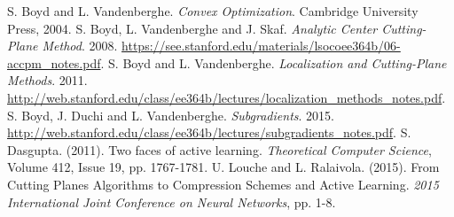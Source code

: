 \documentclass[11pt]{amsart}
\theoremstyle{definition}
\theoremstyle{remark}
\begin{document}
\begin{thebibliography}{99}
     S. Boyd and L. Vandenberghe. \emph{Convex Optimization}. Cambridge University Press, 2004.
     S. Boyd, L. Vandenberghe and J. Skaf. \emph{Analytic Center Cutting-Plane Method}. 2008. \url{https://see.stanford.edu/materials/lsocoee364b/06-accpm_notes.pdf}.
     S. Boyd and L. Vandenberghe. \emph{Localization and Cutting-Plane Methods}. 2011. \url{http://web.stanford.edu/class/ee364b/lectures/localization_methods_notes.pdf}.
     S. Boyd, J. Duchi and L. Vandenberghe. \emph{Subgradients}. 2015. \url{http://web.stanford.edu/class/ee364b/lectures/subgradients_notes.pdf}.
     S. Dasgupta. (2011). Two faces of active learning. \emph{Theoretical Computer Science}, Volume 412, Issue 19, pp. 1767-1781.
     U. Louche and L. Ralaivola. (2015). From Cutting Planes Algorithms to Compression Schemes and Active Learning. \emph{2015 International Joint Conference on Neural Networks}, pp. 1-8.  
\end{thebibliography}




\end{document}
